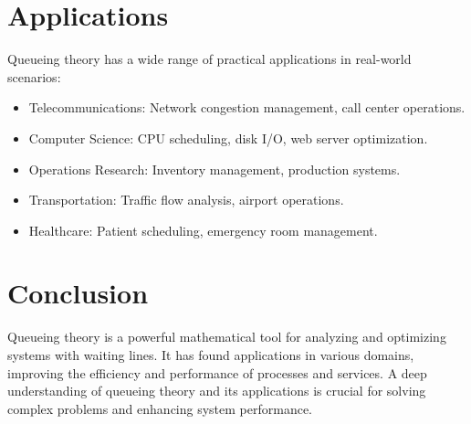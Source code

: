\documentclass{article}
\begin{document}
\section{Applications}

Queueing theory has a wide range of practical applications in real-world scenarios:

\begin{itemize}
\item Telecommunications: Network congestion management, call center operations.
\item Computer Science: CPU scheduling, disk I/O, web server optimization.
\item Operations Research: Inventory management, production systems.
\item Transportation: Traffic flow analysis, airport operations.
\item Healthcare: Patient scheduling, emergency room management.
\end{itemize}

\section{Conclusion}

Queueing theory is a powerful mathematical tool for analyzing and optimizing systems with waiting lines. It has found applications in various domains, improving the efficiency and performance of processes and services. A deep understanding of queueing theory and its applications is crucial for solving complex problems and enhancing system performance.
\end{document}
